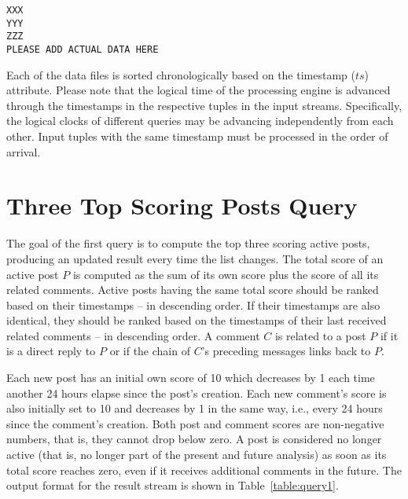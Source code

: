 \documentclass{sig-alternate}
\begin{document}
\lstset{}
\begin{lstlisting}[float=ht,caption={First line from the $comments.dat$ file -- one attribute per line of listing},label={code:like}]
XXX
YYY
ZZZ
PLEASE ADD ACTUAL DATA HERE
\end{lstlisting}

Each of the data files is sorted chronologically based on the timestamp ($ts$) attribute. Please note that the logical time of the processing engine is advanced through the timestamps in the respective tuples in the input streams. Specifically, the logical clocks of different queries may be advancing independently from each other. Input tuples with the same timestamp must be processed in the order of arrival.





\section{Three Top Scoring Posts Query}
\label{sec:query1}
The goal of the first query is to compute the top three scoring active posts, producing an updated result every time the list changes. The total score of an active post $P$ is computed as the sum of its own score plus the score of all its related comments. Active posts having the same total score should be ranked based on their timestamps -- in descending order. If their timestamps are also identical, they should be ranked based on the timestamps of their last received related comments -- in descending order. A comment $C$ is related to a post $P$ if it is a direct reply to $P$ or if the chain of $C$'s preceding messages links back to $P$.

Each new post has an initial own score of 10 which decreases by 1 each time another 24 hours elapse since the post's creation. Each new comment's score is also initially set to 10 and decreases by 1 in the same way, i.e., every 24 hours since the comment's creation. Both post and comment scores are non-negative numbers, that is, they cannot drop below zero. A post is considered no longer active (that is, no longer part of the present and future analysis) as soon as its total score reaches zero, even if it receives additional comments in the future. The output format for the result stream is shown in Table~\ref{table:query1}. 
\end{document}
